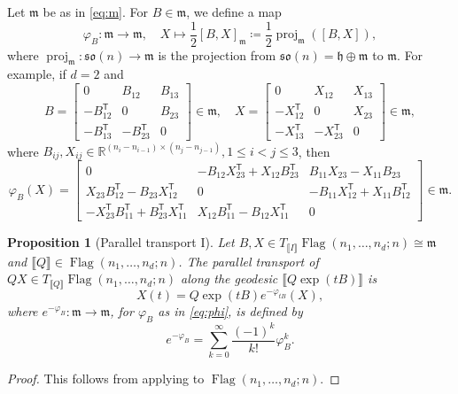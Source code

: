 \documentclass[11pt,reqno]{amsart}%
\newtheorem{proposition}[theorem]{Proposition}
\theoremstyle{definition}
\theoremstyle{remark}
\newcommand{\tp}{{\scriptscriptstyle\mathsf{T}}}
\newcommand{\lb}{\llbracket}
\newcommand{\rb}{\rrbracket}
\DeclareMathOperator{\Flag}{Flag}
\begin{document}
Let $\mathfrak{m}$ be as in \eqref{eq:m}. For $B \in \mathfrak{m}$, we define a map
\begin{equation}\label{eq:phi}
\varphi_{B}: \mathfrak{m} \to \mathfrak{m}, \quad X \mapsto \frac{1}{2}[B,X]_{\mathfrak{m}} \coloneqq  \frac{1}{2} \operatorname{proj}_{\mathfrak{m}} ([B,X]),
\end{equation}
where $\operatorname{proj}_{\mathfrak{m}}:\mathfrak{so}(n) \to \mathfrak{m}$ is the projection from $\mathfrak{so}(n) = \mathfrak{h} \oplus \mathfrak{m}$ to $\mathfrak{m}$. For example, if $d = 2$ and 
\[
B = \begin{bmatrix}
0 & B_{12} & B_{13} \\
-B_{12}^\tp  & 0 & B_{23} \\
-B_{13}^\tp  & -B_{23}^\tp  & 0
\end{bmatrix}\in\mathfrak{m},
\quad X = \begin{bmatrix}
0 & X_{12} & X_{13} \\
-X_{12}^\tp  & 0 & X_{23} \\
-X_{13}^\tp  & -X_{23}^\tp  & 0
\end{bmatrix}\in \mathfrak{m},
\]
where $B_{ij},X_{ij}\in \mathbb{R}^{(n_i-n_{i-1}) \times (n_j-n_{j-1})}, 1\le i < j \le 3$, then 
\[
\varphi_B(X) =  \begin{bmatrix}
0 & -B_{12} X_{23}^\tp  +  X_{12} B_{23}^\tp  & B_{11}X_{23} - X_{11}B_{23} \\
X_{23}B_{12}^\tp  -  B_{23} X_{12}^\tp  & 0 & -B_{11}X_{12}^\tp  + X_{11}B_{12}^\tp \\
-X_{23}^\tp  B_{11}^\tp  + B_{23}^\tp 
X_{11}^\tp  & X_{12} B_{11}^\tp  - B_{12} X_{11}^\tp   & 0
\end{bmatrix}\in \mathfrak{m}.
\]
\begin{proposition}[Parallel transport I]\label{prop:pt}
Let $B,X \in T_{\lb I \rb} \Flag(n_1,\dots, n_d; n) \cong  \mathfrak{m}$ and $\lb Q \rb \in \Flag(n_1,\dots, n_d; n)$. The parallel transport of $QX\in T_{\lb Q \rb}  \Flag(n_1,\dots, n_d; n)$ along the geodesic $\lb Q\exp(tB) \rb$ is
\begin{equation}\label{eq:pt}
X(t) = Q \exp(tB)  e^{-\varphi_{tB}} ( X ),
\end{equation}
where $e^{-\varphi_B}  : \mathfrak{m} \to \mathfrak{m}$, for $\varphi_B$ as in \eqref{eq:phi}, is defined by
\begin{equation}\label{eq:expphi}
e^{-\varphi_B} = \sum_{k=0}^\infty \frac{(-1)^k}{k!} \varphi_B^k.
\end{equation}
\end{proposition}
\begin{proof}
This follows from applying \cite[Lemma~3.1]{Tojo1996} to $\Flag(n_1,\dots, n_d; n)$.
\end{proof}
\end{document}
